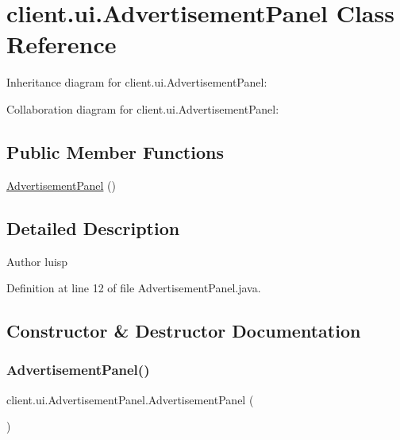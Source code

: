 \hypertarget{classclient_1_1ui_1_1_advertisement_panel}{}\section{client.\+ui.\+Advertisement\+Panel Class Reference}
\label{classclient_1_1ui_1_1_advertisement_panel}


Inheritance diagram for client.\+ui.\+Advertisement\+Panel\+:


Collaboration diagram for client.\+ui.\+Advertisement\+Panel\+:
\subsection*{Public Member Functions}
\begin{DoxyCompactItemize}
\item 
\hyperlink{classclient_1_1ui_1_1_advertisement_panel_a171949b3f26ea771832fa714c352b9e6}{Advertisement\+Panel} ()
\end{DoxyCompactItemize}


\subsection{Detailed Description}
\begin{DoxyAuthor}{Author}
luisp 
\end{DoxyAuthor}


Definition at line 12 of file Advertisement\+Panel.\+java.



\subsection{Constructor \& Destructor Documentation}
\hypertarget{classclient_1_1ui_1_1_advertisement_panel_a171949b3f26ea771832fa714c352b9e6}{}\label{classclient_1_1ui_1_1_advertisement_panel_a171949b3f26ea771832fa714c352b9e6} 
\subsubsection{\texorpdfstring{Advertisement\+Panel()}{AdvertisementPanel()}}
{\footnotesize\ttfamily client.\+ui.\+Advertisement\+Panel.\+Advertisement\+Panel (\begin{DoxyParamCaption}{ }\end{DoxyParamCaption})}

